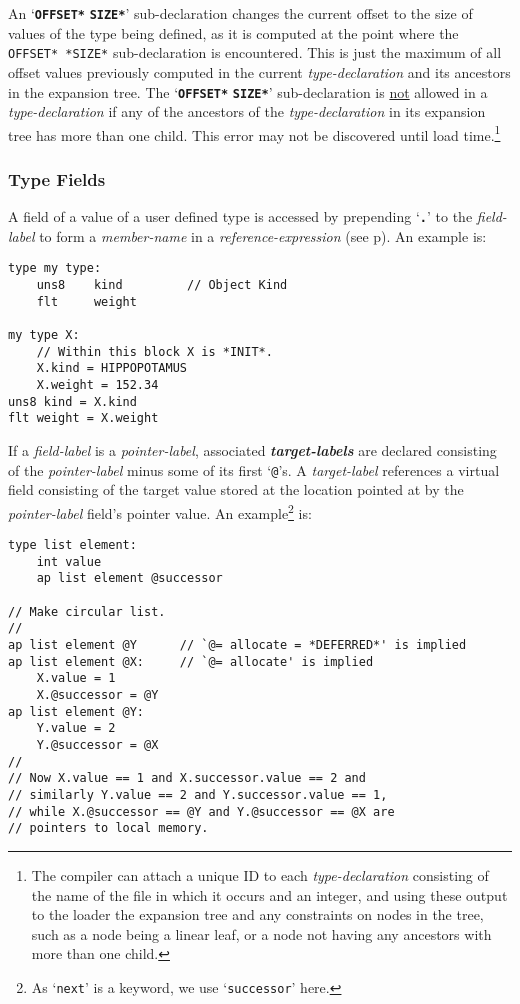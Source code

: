 \documentclass[12pt]{article}
\newcommand{\TT}[1]{{\tt \bfseries #1}}
\newcommand{\ttkey}[1]{{\tt \bfseries #1}}
\newcommand{\emkey}[1]{{\em \bfseries #1}}
\newcommand{\pagref}[1]{p\pageref{#1}}
\newenvironment{indpar}[1][0.3in]%
	{\begin{list}{}%
		     {\setlength{\itemsep}{0in}%
		      \setlength{\topsep}{0in}%
		      \setlength{\parsep}{1ex}%
		      \setlength{\labelwidth}{#1}%
		      \setlength{\leftmargin}{#1}%
		      \addtolength{\leftmargin}{\labelsep}}%
	 \item}%
	{\end{list}}
\begin{document}
An `\ttkey{*OFFSET*} \ttkey{*SIZE*}'\label{OFFSET-SIZE} sub-declaration
changes the current offset to the size of values of the type
being defined, as it is computed at the point where the {\tt *OFFSET* *SIZE*}
sub-declaration is encountered.  This is just the maximum of all
offset values previously computed in the current {\em type-declaration}
and its ancestors in the expansion tree.
The `\ttkey{*OFFSET*} \ttkey{*SIZE*}' sub-declaration
is \underline{not} allowed in a {\em type-declaration}
if any of the ancestors of the {\em type-declaration} in its expansion
tree has more than one child.  This error may not be discovered until
load time.\footnote{
The compiler can attach a unique ID to each {\em type-declaration}
consisting of the name of the file in which it occurs and an integer,
and using these output to the loader the expansion tree and any constraints
on nodes in the tree, such as a node being a linear leaf, or a node not
having any ancestors with more than one child.}

\subsubsection{Type Fields}

A field of a value of a user defined type is accessed by prepending
`\TT{.}' to the {\em field-label} to form a {\em member-name} in
a {\em reference-expression} (see \pagref{RUN-TIME-FIELD-SELECTION}).
An example is:

\begin{indpar}\begin{verbatim}
type my type:
    uns8    kind         // Object Kind
    flt     weight

my type X:
    // Within this block X is *INIT*.
    X.kind = HIPPOPOTAMUS
    X.weight = 152.34
uns8 kind = X.kind
flt weight = X.weight
\end{verbatim}\end{indpar}

If a {\em field-label} is a {\em pointer-label},
associated \emkey{target-labels} are declared consisting of the
{\em pointer-label} minus some of its first `{\tt @}'s.
A {\em target-label}
references a virtual field consisting of the target value stored
at the location pointed at by the {\em pointer-label} field's pointer value.
An example\footnote{As `{\tt next}' is a keyword, we use `{\tt successor}'
here.} is:

\begin{indpar}\begin{verbatim}
type list element:
    int value
    ap list element @successor

// Make circular list.
//
ap list element @Y      // `@= allocate = *DEFERRED*' is implied
ap list element @X:     // `@= allocate' is implied
    X.value = 1
    X.@successor = @Y
ap list element @Y:
    Y.value = 2
    Y.@successor = @X
//
// Now X.value == 1 and X.successor.value == 2 and
// similarly Y.value == 2 and Y.successor.value == 1,
// while X.@successor == @Y and Y.@successor == @X are
// pointers to local memory.
\end{verbatim}\end{indpar}
\end{document}
